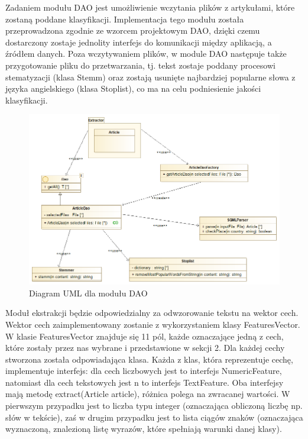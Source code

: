 \documentclass{classrep}
\begin{document}
\indent Zadaniem modułu DAO jest umożliwienie wczytania plików z artykułami, które zostaną poddane klasyfikacji. Implementacja tego modułu została przeprowadzona zgodnie ze wzorcem projektowym DAO, dzięki czemu dostarczony zostaje  jednolity interfejs do komunikacji między aplikacją, a źródłem danych. Poza wczytywaniem plików, w module DAO następuje także przygotowanie pliku do przetwarzania, tj. tekst zostaje poddany procesowi stematyzacji (klasa Stemm) oraz zostają usunięte najbardziej popularne słowa z języka angielskiego (klasa Stoplist), co ma na celu podniesienie jakości klasyfikacji.
\begin{figure}[H]
    \centering
    \includegraphics[width=15cm]{modul_dao.png}
    \caption{Diagram UML dla modułu DAO}
\end{figure}
\indent Moduł ekstrakcji będzie odpowiedzialny za odwzorowanie tekstu na wektor cech. Wektor cech zaimplementowany zostanie z wykorzystaniem klasy FeaturesVector. W klasie FeaturesVector znajduje się 11 pól, każde oznaczające jedną z cech, które zostały przez nas wybrane i przedstawione w sekcji 2. Dla każdej cechy stworzona została odpowiadająca klasa. Każda z klas, która reprezentuje cechę, implementuje interfejs: dla cech liczbowych jest to interfejs NumericFeature, natomiast dla cech tekstowych jest n to interfejs TextFeature.
Oba interfejsy mają metodę extract(Article article), różnica polega na zwracanej wartości. W pierwszym przypadku jest to liczba typu integer (oznaczająca obliczoną liczbę np. słów w tekście), zaś w drugim przypadku jest to lista ciągów znaków (oznaczająca wyznaczoną, znalezioną listę wyrazów, które spełniają warunki danej klasy).
\\
\end{document}

